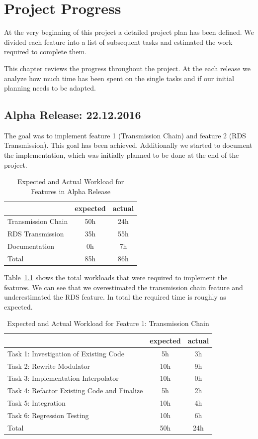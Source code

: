 
\chapter{Project Progress}

At the very beginning of this project a detailed project plan has been defined. We divided each feature into a list of subsequent tasks and estimated the work required to complete them. 

This chapter reviews the progress throughout the project. At the each release we analyze how much time has been spent on the single tasks and if our initial planning needs to be adapted.


\section{Alpha Release: 22.12.2016}

The goal was to implement feature 1 (Transmission Chain) and feature 2 (RDS Transmission). This goal has been achieved. Additionally we started to document the implementation, which was initially planned to be done at the end of the project. 

\begin{table}
\centering
\caption{Expected and Actual Workload for Features in Alpha Release}
\label{tab:alpha:features}
\begin{tabular}{ l | c | c }
	 & expected  & actual \\ \hline
	Transmission Chain & 50h & 24h \\  \hline
	RDS Transmission & 35h & 55h \\ \hline
	Documentation & 0h & 7h \\ \hline \hline
	Total & 85h & 86h 
\end{tabular}
\end{table}

Table~\ref{tab:alpha:features} shows the total workloads that were required to implement the features. We can see that we overestimated the transmission chain feature and underestimated the RDS feature. In total the required time is roughly as expected. 

\begin{table}
	\centering
	\caption{Expected and Actual Workload for Feature 1: Transmission Chain}
	\label{tab:alpha:feature1}
	\begin{tabular}{ l | c | c }
		& expected  & actual \\ \hline
		Task 1: Investigation of Existing Code & 5h & 3h \\  \hline
		Task 2: Rewrite Modulator  & 10h & 9h \\ \hline
		Task 3: Implementation Interpolator & 10h & 0h \\ \hline
		Task 4: Refactor Existing Code and Finalize & 5h& 2h  \\ \hline
		Task 5: Integration & 10h & 4h  \\ \hline
		Task 6: Regression Testing & 10h & 6h  \\ \hline \hline 
		Total & 50h & 24h 
	\end{tabular}
\end{table}

